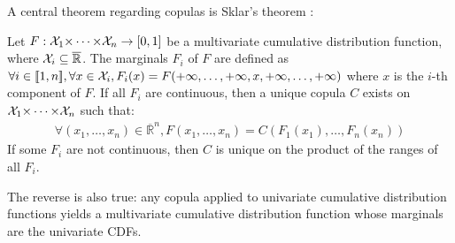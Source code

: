 A central theorem regarding copulas is Sklar's theorem \cite{sklar_fonctions_1959}:
\begin{theorem}\label{theorem:sklar}
    Let $F:{\mathcal{X}}_1{\times\dots\times}{\mathcal{X}}_n\rightarrow[0,1]$ be a multivariate cumulative distribution function, where ${\mathcal{X}}_i\subseteq\overline{\mathbb{R}}$. The marginals $F_i$ of $F$ are defined as $\forall i\in{[\![} 1,n{]\!]} , \forall x\in{\mathcal{X}}_i, F_i(x) = F( +\infty, \dots,  +\infty, x,  +\infty, \dots, +\infty)$ where $x$ is the $i$-th component of $F$. If all $F_i$ are continuous, then a unique copula $C$ exists on ${\mathcal{X}}_1{\times\dots\times}{\mathcal{X}}_n$ such that:
    \begin{eqnarray}
        \forall (x_1,\dots,x_n)\in \overline{\mathbb{R}}^n, F(x_1,\dots,x_n)=C(F_1(x_1),\dots, F_n(x_n))
    \end{eqnarray}
    If some $F_i$ are not continuous, then $C$ is unique on the product of the ranges of all $F_i$.
    
    The reverse is also true: any copula applied to univariate cumulative distribution functions yields a multivariate cumulative distribution function whose marginals are the univariate CDFs.
\end{theorem}

